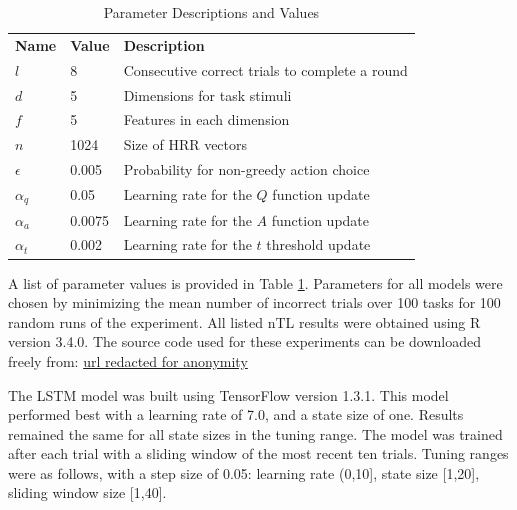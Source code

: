 \documentclass[10pt,letterpaper]{article}
\begin{document}
\begin{table}[!b]
{\small
  \caption{Parameter Descriptions and Values }
  \label{tab:parameters}
  \centering
  \begin{tabular}{lll}
    \toprule
    \midrule
    \textbf{Name}     & \textbf{Value}    & \textbf{Description}   \\
    $ l $   & 8         & Consecutive correct trials to complete a round \\
    $ d $   & 5         & Dimensions for task stimuli \\
    $ f $   & 5         & Features in each dimension \\
    $ n $   & 1024      & Size of HRR vectors \\
    $ \epsilon $ & 0.005 & Probability for non-greedy action choice \\
    $ \alpha_q $ & 0.05  & Learning rate for the $ Q $ function update \\
    $ \alpha_a $ & 0.0075 & Learning rate for the $ A $ function update \\
    $ \alpha_t $ & 0.002 & Learning rate for the $ t $ threshold update \\
    \bottomrule
  \end{tabular}
}
\end{table}

A list of parameter values is provided in Table \ref{tab:parameters}. Parameters for all models were chosen by minimizing the mean number of incorrect trials over 100 tasks for 100 random runs of the experiment. All listed nTL results were obtained using R version 3.4.0. The source code used for these experiments can be downloaded freely from: \url{url redacted for anonymity}

The LSTM model was built using TensorFlow version 1.3.1. This model performed best with a learning rate of 7.0, and a state size of one. Results remained the same for all state sizes in the tuning range. The model was trained after each trial with a sliding window of the most recent ten trials. Tuning ranges were as follows, with a step size of 0.05: learning rate (0,10], state size [1,20], sliding window size [1,40].
\end{document}
